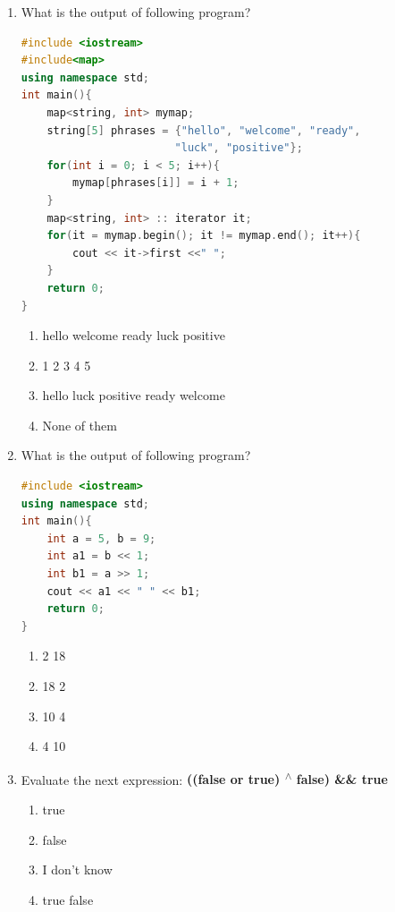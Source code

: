 \documentclass[10pt]{article}
\begin{document}
\begin{enumerate}
\item What is the output of following program?
\begin{lstlisting}[language=C++]
#include <iostream>
#include<map>
using namespace std;
int main(){
    map<string, int> mymap;
    string[5] phrases = {"hello", "welcome", "ready", 
                        "luck", "positive"};
    for(int i = 0; i < 5; i++){
        mymap[phrases[i]] = i + 1;
    }
    map<string, int> :: iterator it;
    for(it = mymap.begin(); it != mymap.end(); it++){
        cout << it->first <<" ";
    }
    return 0;
}

\end{lstlisting}
\begin{enumerate}
    \item hello welcome ready luck positive
    \item 1 2 3 4 5
    \item hello luck positive ready welcome 
    \item None of them
\end{enumerate}



\item What is the output of following program?
\begin{lstlisting}[language=C++]
#include <iostream>
using namespace std;
int main(){
    int a = 5, b = 9;
    int a1 = b << 1;
    int b1 = a >> 1;
    cout << a1 << " " << b1;
    return 0;
}
\end{lstlisting}
\begin{multicols}{4}
\begin{enumerate}
    \item 2 18
    \item 18 2 
    \item 10 4
    \item 4 10
\end{enumerate}
\end{multicols}


\item Evaluate the next expression: \textbf{((false or true) \textsuperscript{$\wedge$} false) \&\& true}
\begin{multicols}{4}
\begin{enumerate}
    \item true 
    \item false
    \item I don't know
    \item true false
\end{enumerate}
\end{multicols}



\end{enumerate}
\end{document}
